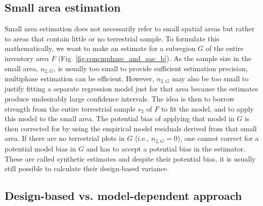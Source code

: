 \documentclass[article]{jss}
\begin{document}
\subsection{Small area estimation}

Small area estimation does not necessarily refer to small spatial areas but rather to areas that contain little or no terrestrial sample. To formulate this mathematically, we want to make an estimate for a subregion $G$ of the entire inventory area $F$ (Fig. \ref{fig:concmphase_and_sae_b}). As the sample size in the small area, $n_{2,G}$, is usually too small to provide sufficient estimation precision, multiphase estimation can be efficient. However, $n_{2,G}$ may also be too small to justify fitting a separate regression model just for that area because the estimates produce undesirably large confidence intervals. The idea is then to borrow strength from the entire terrestrial sample $s_2$ of $F$ to fit the model, and to apply this model to the small area. The potential bias of applying that model in $G$ is then corrected for by using the empirical model residuals derived from that small area. If there are no terrestrial plots in $G$ (i.e., $n_{2,G}=0$), one cannot correct for a potential model bias in $G$ and has to accept a potential bias in the estimator. These are called synthetic estimates and despite their potential bias, it is usually still possible to calculate their design-based variance.


\subsection{Design-based vs. model-dependent approach}
\label{sec:db_vs_md}
\end{document}

